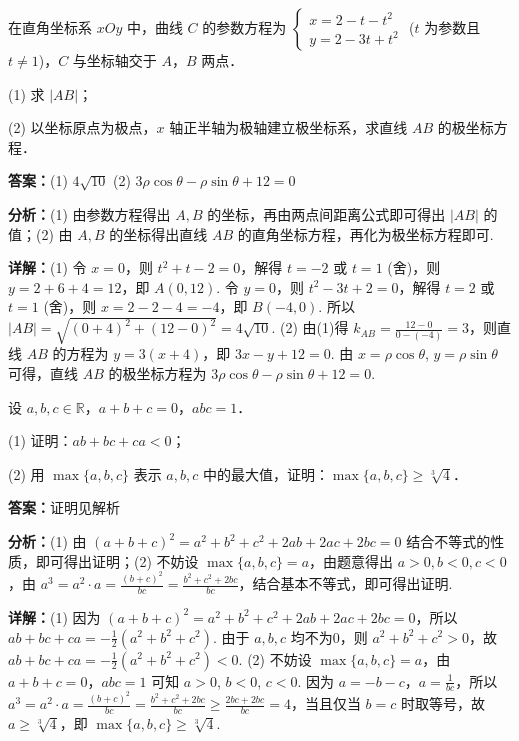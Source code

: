 \begin{question}[points=10]
[选修4-4：坐标系与参数方程]

在直角坐标系 $xOy$ 中，曲线 $C$ 的参数方程为 $\begin{cases} x=2-t-t^2 \\ y=2-3t+t^2 \end{cases}$ ($t$ 为参数且 $t\neq1$)，$C$ 与坐标轴交于 $A$，$B$ 两点．

(1) 求 $|AB|$；

(2) 以坐标原点为极点，$x$ 轴正半轴为极轴建立极坐标系，求直线 $AB$ 的极坐标方程．
\begin{solution}
\textbf{答案：}(1) $4\sqrt{10}$ (2) $3\rho\cos\theta-\rho\sin\theta+12=0$

\textbf{分析：}(1) 由参数方程得出 $A,B$ 的坐标，再由两点间距离公式即可得出 $|AB|$ 的值；(2) 由 $A,B$ 的坐标得出直线 $AB$ 的直角坐标方程，再化为极坐标方程即可.

\textbf{详解：}(1) 令 $x=0$，则 $t^2+t-2=0$，解得 $t=-2$ 或 $t=1$ (舍)，则 $y=2+6+4=12$，即 $A(0,12)$. 令 $y=0$，则 $t^2-3t+2=0$，解得 $t=2$ 或 $t=1$ (舍)，则 $x=2-2-4=-4$，即 $B(-4,0)$. 所以 $|AB|=\sqrt{(0+4)^2+(12-0)^2}=4\sqrt{10}$.
(2) 由(1)得 $k_{AB}=\frac{12-0}{0-(-4)}=3$，则直线 $AB$ 的方程为 $y=3(x+4)$，即 $3x-y+12=0$. 由 $x=\rho\cos\theta$, $y=\rho\sin\theta$ 可得，直线 $AB$ 的极坐标方程为 $3\rho\cos\theta-\rho\sin\theta+12=0$.
\end{solution}
\end{question}

\begin{question}[points=10]
[选修4-5：不等式选讲]

设 $a,b,c\in\mathbb R$，$a+b+c=0$，$abc=1$．

(1) 证明：$ab+bc+ca<0$；

(2) 用 $\max\{a,b,c\}$ 表示 $a,b,c$ 中的最大值，证明：$\max\{a,b,c\}\geq\sqrt[3]{4}$．
\begin{solution}
\textbf{答案：}证明见解析

\textbf{分析：}(1) 由 $(a+b+c)^2=a^2+b^2+c^2+2ab+2ac+2bc=0$ 结合不等式的性质，即可得出证明；(2) 不妨设 $\max\{a,b,c\}=a$，由题意得出 $a>0,b<0,c<0$，由 $a^3=a^2\cdot a=\frac{(b+c)^2}{bc}=\frac{b^2+c^2+2bc}{bc}$，结合基本不等式，即可得出证明.

\textbf{详解：}(1) 因为 $(a+b+c)^2=a^2+b^2+c^2+2ab+2ac+2bc=0$，所以 $ab+bc+ca=-\frac{1}{2}(a^2+b^2+c^2)$. 由于 $a,b,c$ 均不为0，则 $a^2+b^2+c^2>0$，故 $ab+bc+ca=-\frac{1}{2}(a^2+b^2+c^2)<0$.
(2) 不妨设 $\max\{a,b,c\}=a$，由 $a+b+c=0$，$abc=1$ 可知 $a>0$, $b<0$, $c<0$. 因为 $a=-b-c$，$a=\frac{1}{bc}$，所以 $a^3=a^2\cdot a=\frac{(b+c)^2}{bc}=\frac{b^2+c^2+2bc}{bc}\geq\frac{2bc+2bc}{bc}=4$，当且仅当 $b=c$ 时取等号，故 $a\geq\sqrt[3]{4}$，即 $\max\{a,b,c\}\geq\sqrt[3]{4}$.
\end{solution}
\end{question}

